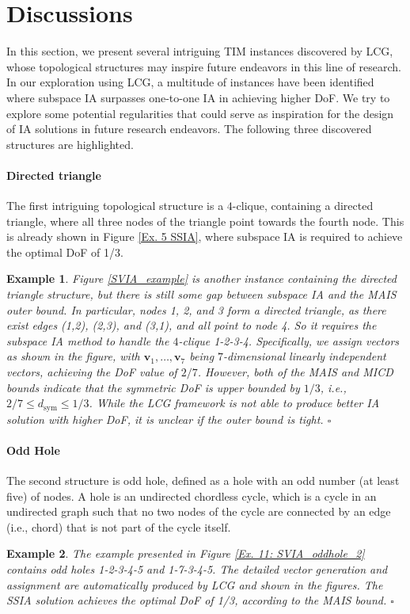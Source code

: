 \documentclass[a4paper,journal]{IEEEtran}
\def\v {\mathbf{v}}
\newtheorem{exe}{Example}
\begin{document}
\section{Discussions}\label{Discussions}
In this section, we present several intriguing TIM instances discovered by LCG, whose topological structures may inspire future endeavors in this line of research.
In our exploration using LCG, a multitude of instances have been identified where subspace IA surpasses one-to-one IA in achieving higher DoF. We try to explore some potential regularities that could serve as inspiration for the design of IA solutions in future research endeavors. The following three discovered structures are highlighted. 

\paragraph{Directed triangle}\label{Directed triangle Discussion}The first intriguing topological structure is a $4$-clique, containing a directed triangle, where all three nodes of the triangle point towards the fourth node. This is already shown in Figure \ref{Ex. 5 SSIA}, where subspace IA is required to achieve the optimal DoF of 1/3.
\begin{exe}\label{SVIA_example_section}
Figure \ref{SVIA_example} is another instance containing the \textit{directed triangle} structure, but there is still some gap between subspace IA and the MAIS outer bound. In particular, nodes 1, 2, and 3 form a directed triangle, as there exist edges (1,2), (2,3), and (3,1), and all point to node 4. So it requires the subspace IA method to handle the $4$-clique 1-2-3-4. Specifically, we assign vectors as shown in the figure, with $\v_1, \dots, \v_7$ being $7$-dimensional linearly independent vectors, achieving the DoF value of $2/7$. 
However, both of the MAIS and MICD bounds indicate that the symmetric DoF is upper bounded by $1/3$, i.e., $2/7 \le d_{\mathrm{sym}} \le 1/3$. 
While the LCG framework is not able to produce better IA solution with higher DoF, it is unclear if the outer bound is tight.
\hfill $\square$
\end{exe}

\paragraph{Odd Hole} 
The second structure is odd hole, defined as a hole with an odd number (at least five) of nodes.
A hole is an undirected chordless cycle, which is a cycle in an undirected graph such that no two nodes of the cycle are connected by an edge (i.e., chord) that is not part of the cycle itself. 
\begin{exe} \label{odd_hole_exe}
The example presented in Figure \ref{Ex. 11: SVIA_oddhole_2} contains odd holes 1-2-3-4-5 and 1-7-3-4-5. The detailed vector generation and assignment are automatically produced by LCG and shown in the figures. The SSIA solution achieves the optimal DoF of 1/3, according to the MAIS bound. \hfill $\square$
\end{exe}
\end{document}
